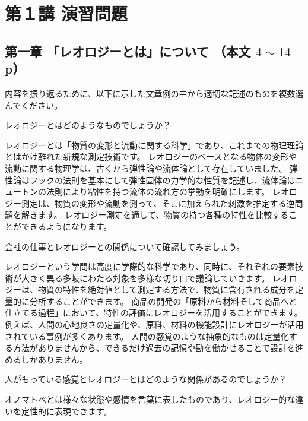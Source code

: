 \documentclass[uplatex,dvipdfmx,a4paper,11pt]{jsarticle}
\begin{document}
\section*{第１講 演習問題}    

\subsection*{第一章 「レオロジーとは」について （本文 $4\sim14$ p）}

内容を振り返るために、以下に示した文章例の中から適切な記述のものを複数選んでください。
\begin{qlist}
	\qitem レオロジーとはどのようなものでしょうか？
		\begin{qlist2}
			\qitem レオロジーとは「物質の変形と流動に関する科学」であり、これまでの物理理論とはかけ離れた新規な測定技術です。
			\qitem レオロジーのベースとなる物体の変形や流動に関する物理学は、古くから弾性論や流体論として存在していました。
			\qitem 弾性論はフックの法則を基本にして弾性固体の力学的な性質を記述し、流体論はニュートンの法則により粘性を持つ流体の流れ方の挙動を明確にします。
			\qitem レオロジー測定は、物質の変形や流動を測って、そこに加えられた刺激を推定する逆問題を解きます。
			\qitem レオロジー測定を通して、物質の持つ各種の特性を比較することができるようになります。
    \end{qlist2}
    \vspace{3mm}
	\qitem 会社の仕事とレオロジーとの関係について確認してみましょう。
		\begin{qlist2}
			\qitem レオロジーという学問は高度に学際的な科学であり、同時に、それぞれの要素技術が大きく異る多岐にわたる対象を多様な切り口で議論していきます。
			\qitem レオロジーは、物質の特性を絶対値として測定する方法で、物質に含有される成分を定量的に分析することができます。
			\qitem 商品の開発の「原料から材料そして商品へと仕立てる過程」において、特性の評価にレオロジーを活用することができます。
            \qitem 例えば、人間の心地良さの定量化や、原料、材料の機能設計にレオロジーが活用されている事例が多くあります。
            \qitem 人間の感覚のような抽象的なものは定量化する方法がありませんから、できるだけ過去の記憶や勘を働かせることで設計を進めるしかありません。
    \end{qlist2}
    \vspace{3mm}
	\qitem 人がもっている感覚とレオロジーとはどのような関係があるのでしょうか？
		\begin{qlist2}
            \qitem オノマトペとは様々な状態や感情を言葉に表したものであり、レオロジー的な違いを定性的に表現できます。

\end{qlist2}
\end{qlist}
\end{document}
